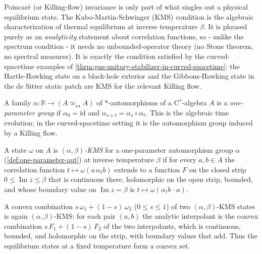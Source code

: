 Poincar\'e (or Killing-flow) invariance is only part of what singles out a physical equilibrium state. The Kubo-Martin-Schwinger (KMS) condition is the algebraic characterization of thermal equilibrium at inverse temperature $\beta$. It is phrased purely as an \emph{analyticity} statement about correlation functions, so - unlike the spectrum condition - it needs no unbounded-operator theory (no Stone theorem, no spectral measures). It is exactly the condition satisfied by the curved-spacetime examples of \ref{thrm:gns-unitary-stabilizer-in-curved-spacetime}: the Hartle-Hawking state on a black-hole exterior and the Gibbons-Hawking state in the de Sitter static patch are KMS for the relevant Killing flow.

\begin{definition}
    \label{def:one-parameter-aut}
    \leanok
    A family $\alpha : \mathbb{R} \to (A \simeq_{\star\mathrm{a}} A)$ of $*$-automorphisms of a C$^*$-algebra $A$ is a \emph{one-parameter group} if $\alpha_0 = \mathrm{id}$ and $\alpha_{s+t} = \alpha_s \circ \alpha_t$. This is the algebraic time evolution; in the curved-spacetime setting it is the automorphism group induced by a Killing flow.
\end{definition}

\begin{definition}
    \label{def:kms-state}
    \leanok
    A state $\omega$ on $A$ is \emph{$(\alpha, \beta)$-KMS} for a one-parameter automorphism group $\alpha$ (\ref{def:one-parameter-aut}) at inverse temperature $\beta$ if for every $a, b \in A$ the correlation function $t \mapsto \omega(a\,\alpha_t b)$ extends to a function $F$ on the closed strip $0 \le \operatorname{Im} z \le \beta$ that is continuous there, holomorphic on the open strip, bounded, and whose boundary value on $\operatorname{Im} z = \beta$ is $t \mapsto \omega(\alpha_t b\, \cdot a)$.
\end{definition}

\begin{theorem}
    \label{thrm:kms-convex}
    \leanok
    A convex combination $s\,\omega_1 + (1-s)\,\omega_2$ ($0 \le s \le 1$) of two $(\alpha, \beta)$-KMS states is again $(\alpha, \beta)$-KMS: for each pair $(a, b)$ the analytic interpolant is the convex combination $s\,F_1 + (1-s)\,F_2$ of the two interpolants, which is continuous, bounded, and holomorphic on the strip, with boundary values that add. Thus the equilibrium states at a fixed temperature form a convex set.
\end{theorem}

